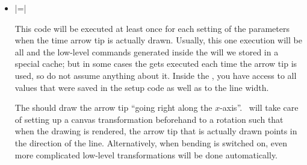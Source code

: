 \begin{command}{\pgfdeclarearrow{}}
\begin{itemize}
            \begin{command}{\pgfarrowssave{}}
                As explained earlier, the setup code needs to ``communicate''
                with the drawing code via ``saved values''. This command get
                the name of a macro and will store the value this macro had
                internally. Then, each time drawing code is executed, the value
                of this macro will be restored.
            \end{command}

            \begin{command}{\pgfarrowssavethe{}}
                Works like |\pgfarrowssave|, only the parameter must be a
                register and |\the| will be saved. Typically,
                you will write something like
\begin{codeexample}
\pgfarrowssavethe{\pgfarrowlength}
\pgfarrowssavethe{\pgfarrowwidth}
\end{codeexample}
                To ensure that inside the drawing code the the dimension
                registers |\pgfarrowlength| and |\pgfarrowwidth| are setup with
                the values they had during the setup.
            \end{command}
        \item {}|=|

            This code will be executed at least once for each setting of the
            parameters when the time arrow tip is actually drawn. Usually, this
            one execution will be all and the low-level commands generated
            inside the  will we stored in a special cache; but in
            some cases the  gets executed each time the arrow tip is
            used, so do not assume anything about it. Inside the ,
            you have access to all values that were saved in the setup code as
            well as to the line width.

            The  should draw the arrow tip ``going right along the
            $x$-axis''. \pgfname\ will take care of setting up a  canvas
            transformation beforehand to a rotation such that when the drawing
            is rendered, the arrow tip that is  actually drawn points in the
            direction of the line. Alternatively, when bending is switched on,
            even more complicated low-level transformations will be done
            automatically.


\end{itemize}
\end{command}
